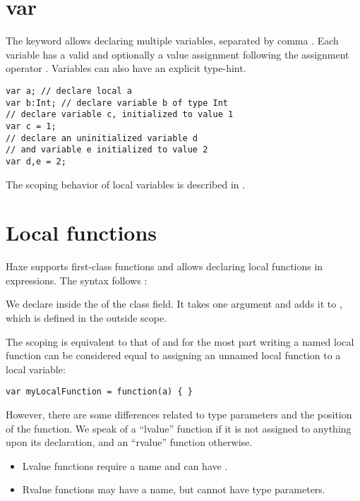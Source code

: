 \section{var}
\label{expression-var}

The  keyword allows declaring multiple variables, separated by comma \expr{,}. Each variable has a valid  and optionally a value assignment following the assignment operator \expr{=}. Variables can also have an explicit type-hint.

\begin{lstlisting}
var a; // declare local a
var b:Int; // declare variable b of type Int
// declare variable c, initialized to value 1
var c = 1;
// declare an uninitialized variable d
// and variable e initialized to value 2
var d,e = 2;
\end{lstlisting}

The scoping behavior of local variables is described in .


\section{Local functions}
\label{expression-function}

Haxe supports first-class functions and allows declaring local functions in expressions. The syntax follows :


We declare  inside the  of the  class field. It takes one argument  and adds it to , which is defined in the outside scope.

The scoping is equivalent to that of  and for the most part writing a named local function can be considered equal to assigning an unnamed local function to a local variable:

\begin{lstlisting}
var myLocalFunction = function(a) { }
\end{lstlisting}

However, there are some differences related to type parameters and the position of the function. We speak of a ``lvalue'' function if it is not assigned to anything upon its declaration, and an ``rvalue'' function otherwise.

\begin{itemize}
	\item Lvalue functions require a name and can have .
	\item Rvalue functions may have a name, but cannot have type parameters.
\end{itemize}


